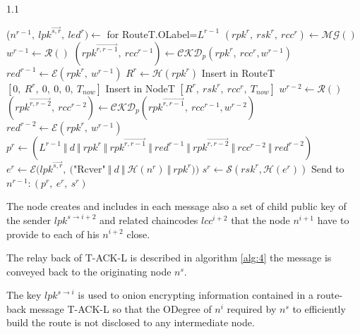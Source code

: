\documentclass[12pt,oneside]{wlscirep}
\DeclareRobustCommand{\kder}[1]{{\overrightarrow{{#1}}}}
\begin{document}
\begin{algorithm}
\caption{On receiver node $n^r$, start of T-ACK-L reverse propagation.}
\label{alg:3}
\begin{spacing}{1.1}
\begin{algorithmic}[1] 

	\State ($n^{r-1},~lpk^\kder{s,r},~led^r) \gets$ for RouteT.OLabel=$L^{r-1}$ 
	\State $(rpk^r,~rsk^r,~rcc^r) \gets \mathcal{MG}()$
	\State $w^{r-1} \gets \mathcal{R}()$
	\State $(rpk^\kder{r,r-1},~rcc^{r-1}) \gets \mathcal{CKD}_p(rpk^r, ~rcc^r, w^{r-1})$
    \State $red^{r-1} \gets \mathcal{E}(rpk^r,~w^{r-1})$
	\State $R^r \gets \mathcal{H}(rpk^r)$
	\State Insert in RouteT $[0,~R^r,~0,~0,~0,~T_{now}]$ 
	\State Insert in NodeT $[R^r,~rsk^r,~rcc^r,~T_{now}]$ 
	\State $w^{r-2} \gets \mathcal{R}()$
	\State $(rpk^\kder{r,r-2},~rcc^{r-2}) \gets \mathcal{CKD}_p(rpk^\kder{r,r-1}, ~rcc^{r-1}, w^{r-2})$
    \State $red^{r-2} \gets \mathcal{E}(rpk^r,~w^{r-1})$
	\State $p^r \gets (L^{r-1}~\Vert~d~\Vert~rpk^r~\Vert~rpk^\kder{r,r-1}~\Vert~red^{r-1}~\Vert~rpk^\kder{r,r-2}~\Vert~rcc^{r-2}~\Vert~red^{r-2})$
	\State $e^r \gets \mathcal{E}(lpk^\kder{s,r},~($"Rcver"$~\Vert~d~\Vert~\mathcal{H}(n^r)~\Vert~rpk^r))$
	\State $s^r \gets \mathcal{S}(rsk^r,\mathcal{H}(e^r))$
	\State Send to $n^{r-1}: (p^r,~e^r,~s^r)$ 
\EndProcedure
\end{algorithmic}
\end{spacing}
\end{algorithm}
The node creates and includes in each message also a set of child public key of the sender $lpk^{s \to i+2}$ and related chaincodes $lcc^{i+2}$ that the node $n^{i+1}$ have to provide to each of his $n^{i+2}$ close. \par
\clearpage
The relay back of T-ACK-L is described in algorithm \ref{alg:4} the message is conveyed back to the originating node $n^s$.\par
The key $lpk^{s \to i}$ is used to onion encrypting information contained in a route-back message T-ACK-L so that the ODegree of $n^i$  required by $n^s$ to efficiently build the route is not disclosed to any intermediate node.\par
\end{document}
